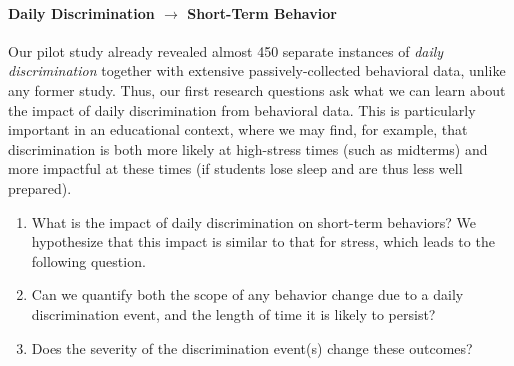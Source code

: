 \paragraph{Daily Discrimination $\rightarrow$ Short-Term Behavior} Our pilot study already revealed almost 450 separate instances of  \textit{daily discrimination} together with extensive passively-collected behavioral data, unlike any former study. Thus, our first research questions ask what we can learn about the impact of daily discrimination from behavioral data. This is particularly important in an educational context, where we may find, for example, that discrimination is both more likely at high-stress times (such as midterms) and more impactful at these times (if students lose sleep and are thus less well prepared). 
\begin{enumerate}[start=1,label={\bfseries RQ\arabic*}, leftmargin=1cm]
    \item \label{itm:rq-behavior} What is the impact of daily discrimination on short-term behaviors?  We hypothesize that this impact is similar to that for stress, which leads to the following question.
    \item \label{itm:rq-behavior-size} Can we quantify both the scope of any behavior change due to a daily discrimination event, and the length of time it is likely to persist? 
    \item \label{itm:rq-severity-impact} Does the severity of the discrimination event(s) change these outcomes?
\end{enumerate}

